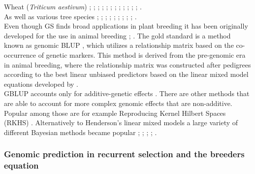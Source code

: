 Wheat (\textit{Triticum aestivum}) \cite{Thavamanikumar_2015}; \cite{Lopez_Cruz_2015};
\cite{Sukumaran_2016}; \cite{Bustos_Korts_2016}; \cite{Gianola_2016_wheat};
\cite{Crossa_2016_wheat}; \cite{Rincent_2018}; \cite{Norman_2018}; \cite{Belamkar_2018};
\cite{Ovenden_2018}; \cite{Cuevas_2019}; \cite{Howard_2019}; \cite{Krause_2019}. \\
As well as various tree species \cite{Holliday_2012}; \cite{Resende_2012}; \cite{Zapata_Valenzuela_2013};  \cite{Jaramillo_Correa_2014}; \cite{Kumar_2015}; \cite{GamalElDien_2016}; \cite{Rincent_2018}; \cite{Ratcliffe_2017}; \cite{Kainer_2018}; \cite{deAlmeidaFilho2019}. \\
Even though GS finds broad applications in plant breeding it has been originally developed
for the use in animal breeding \cite{hayes2010genome}; \cite{goddard2011using}. The gold
standard is a method known as genomic BLUP \cite{vanraden2008efficient}, which utilizes a
relationship matrix based on the co-occurrence of genetic markers. This method is derived
from the pre-genomic era in animal breeding, where the relationship matrix was constructed
after pedigrees according to the best linear unbiased predictors based on the linear mixed
model equations developed by \cite{henderson1975best}. \\
GBLUP accounts only for additive-genetic effects \cite{vanraden2008efficient}. There are
other methods that are able to account for more complex genomic effects that are
non-additive. Popular among those are for example Reproducing Kernel Hilbert Spaces (RKHS)
\cite{gianola2008reproducing}. Alternatively to Henderson's linear mixed models a large
variety of different Bayesian methods became popular \cite{hayes2001}; \cite{gianola2009};
\cite{habier2011}; \cite{gianola2013}; \cite{crossa2017}.

\subsubsection{Genomic prediction in recurrent selection and the breeders equation}

